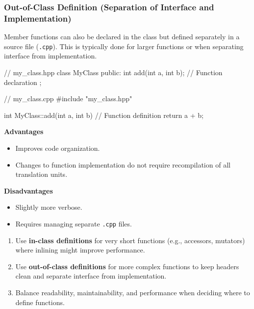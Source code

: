 \subsubsection{Out-of-Class Definition (Separation of Interface and Implementation)}

Member functions can also be declared in the class but defined separately in a source file (\texttt{.cpp}). This is typically done for larger functions or when separating interface from implementation.

\begin{codeblock}[language=C++, numbers=none]
// my_class.hpp
class MyClass {
public:
    int add(int a, int b); // Function declaration
};
\end{codeblock}

\begin{codeblock}[language=C++, numbers=none]
// my_class.cpp
#include "my_class.hpp"

int MyClass::add(int a, int b) { // Function definition
    return a + b;
}
\end{codeblock}

\begin{minipage}{0.48\textwidth}
    \textbf{Advantages}
    \begin{itemize}
        \item Improves code organization.
        \item Changes to function implementation do not require recompilation of all translation units.
    \end{itemize}
\end{minipage}%
\hfill
\begin{minipage}{0.48\textwidth}
    \textbf{Disadvantages}
    \begin{itemize}
        \item Slightly more verbose.
        \item Requires managing separate \texttt{.cpp} files.
    \end{itemize}
\end{minipage}

\begin{tipsblock}
    \begin{enumerate}
        \item Use \textbf{in-class definitions} for very short functions (e.g., accessors, mutators) where inlining might improve performance.
        \item Use \textbf{out-of-class definitions} for more complex functions to keep headers clean and separate interface from implementation.
        \item Balance readability, maintainability, and performance when deciding where to define functions.
    \end{enumerate}
\end{tipsblock}

